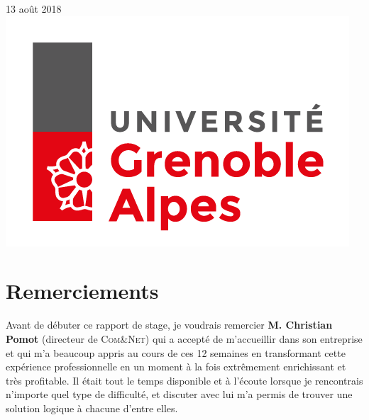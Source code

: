 \documentclass[12pt]{article}
\begin{document}
\begin{titlepage}
{\large 13 août 2018}\\[4cm] %


\includegraphics[scale=0.25]{logoUGA.png}\\[1cm] %
 

\vfill %

\end{titlepage}


\renewcommand{\contentsname}{Table des matières}

\tableofcontents{}



\newpage
\section{Remerciements}

Avant de débuter ce rapport de stage, je voudrais remercier \textbf{M. Christian Pomot} (directeur de \textsc{Com\&Net}) qui a accepté de m'accueillir dans son entreprise et qui m’a beaucoup appris au cours de ces 12 semaines en transformant cette expérience professionnelle en un moment à la fois extrêmement enrichissant et très profitable. Il était tout le temps disponible et à l'écoute lorsque je rencontrais n'importe quel type de difficulté, et discuter avec lui m'a permis de trouver une solution logique à chacune d'entre elles. 
\end{document}

